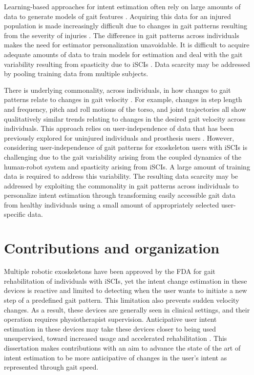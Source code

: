Learning-based approaches for intent estimation often rely on large amounts of data to generate models of gait features \cite{lee2020image,moolchandani2021design}. Acquiring this data for an injured population is made increasingly difficult due to changes in gait patterns resulting from the severity of injuries \cite{sohn2018variability}. The difference in gait patterns across individuals makes the need for estimator personalization unavoidable. It is difficult to acquire adequate amounts of data to train models for estimation and deal with the gait variability resulting from spasticity due to iSCIs \cite{krawetz1996gait}. Data scarcity may be addressed by pooling training data from multiple subjects.

There is underlying commonality, across individuals, in how changes to gait patterns relate to changes in gait velocity \cite{li1999coordination}. For example, changes in step length and frequency, pitch and roll motions of the torso, and joint trajectories all show qualitatively similar trends relating to changes in the desired gait velocity across individuals. This approach relies on user-independence of data that has been previously explored for uninjured individuals \cite{ibrahim2008gait, kilmartin2009optimising, wang2008accelerometry} and prosthesis users \cite{young2015classification}. However, considering user-independence of gait patterns for exoskeleton users with iSCIs is challenging due to the gait variability arising from the coupled dynamics of the human-robot system and spasticity arising from \mbox{iSCIs}. A large amount of training data is required to address this variability. The resulting data scarcity may be addressed by exploiting the commonality in gait patterns across individuals to personalize intent estimation through transforming easily accessible gait data from healthy individuals using a small amount of appropriately selected user-specific data.

\section{Contributions and organization}\label{sec:contribution}

Multiple robotic exoskeletons have been approved by the FDA for gait rehabilitation of individuals with iSCIs, yet the intent change estimation in these devices is reactive and limited to detecting when the user wants to initiate a new step of a predefined gait pattern. This limitation also prevents sudden velocity changes. As a result, these devices are generally seen in clinical settings, and their operation requires physiotherapist supervision. Anticipative user intent estimation in these devices may take these devices closer to being used unsupervised, toward increased usage and accelerated rehabilitation \cite{hidler2011role}. This dissertation makes contributions with an aim to advance the state of the art of intent estimation to be more anticipative of changes in the user's intent as represented through gait speed.

